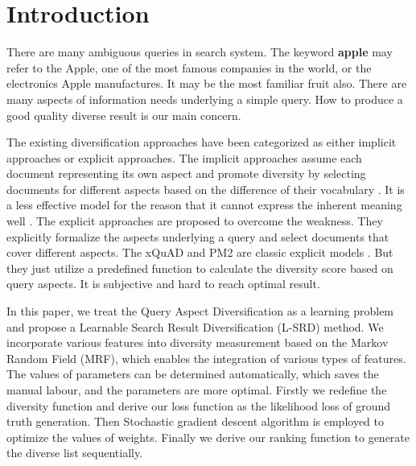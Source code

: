 \documentclass[review]{elsarticle}
\newcommand\revised[1]{{\color{black} #1}}
\begin{document}
\section{Introduction}
There are many ambiguous queries in search system. The keyword \textbf{apple} may refer to the Apple, one of the most famous companies in the world, or the electronics Apple manufactures. It may be the most familiar fruit also. There are many aspects of information needs underlying a simple query. How to produce a good quality diverse result is our main concern. 


\revised{
	The existing diversification approaches have been categorized as either implicit approaches or explicit approaches. The implicit approaches assume each document representing its own aspect and promote diversity by selecting documents for different aspects based on the difference of their vocabulary \cite{carbonell1998use}. It is a less effective model for the reason that it cannot express the inherent meaning well \cite{agrawal2009diversifying,zhai2003beyond}. 
	The explicit approaches are proposed to overcome the weakness. They explicitly formalize the aspects underlying a query and select documents that cover different aspects. The xQuAD and PM2 are classic explicit models \cite{santos2010exploiting,dang2012diversity}.
	But they just utilize a predefined function to calculate the diversity score based on query aspects. It is subjective and hard to reach optimal result.}


In this paper, we treat the Query Aspect Diversification as a learning problem and propose a Learnable Search Result Diversification (L-SRD) method. We incorporate various features into diversity measurement based on the Markov Random Field (MRF), which enables the integration of various types of features. The values of parameters can be determined automatically, which saves the manual labour, and the parameters are more optimal. Firstly we redefine the diversity function and derive our loss function as the likelihood loss of ground truth generation. Then Stochastic gradient descent algorithm is employed to optimize the values of weights. Finally we derive our ranking function to generate the diverse list sequentially.

\end{document}
